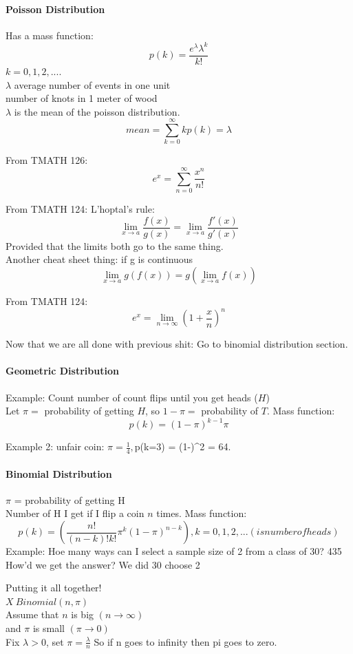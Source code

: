 \documentclass{article}
\newcommand{\p}[1]{\paragraph{#1}} %
\begin{document}
		\p{Poisson Distribution}
		Has a mass function:
		\[
			p(k) = \frac{e^\lambda \lambda^k}{k!}
		\]
		$k = 0, 1, 2,....$ \\
		$\lambda$ average number of events in one unit \\
		\hspace{17pt} number of knots in 1 meter of wood\\
		$\lambda$ is the mean of the poisson distribution.
		\[
			mean = \sum_{k=0}^{\infty} kp(k) = \lambda
		\]
		
		From TMATH 126:
		\[
			e^x = \sum_{n=0}^{\infty} \frac{x^n}{n!}
		\]
		
		From TMATH 124: L'hoptal's rule:
		\[
			\lim_{x\to a} \frac{f(x)}{g(x)} = \lim_{x\to a} \frac{f\prime(x)}{g\prime(x)}
		\]
		Provided that the limits both go to the same thing. \\
		
		Another cheat sheet thing: if g is continuous
		\[
			\lim_{x\to a} g(f(x)) = g(\lim_{x\to a} f(x))
		\]
		
		From TMATH 124:
		\[
			e^x = \lim_{n\to\infty} (1 + \frac{x}{n})^n
		\]
		
		Now that we are all done with previous shit: Go to binomial distribution section.
		
		\p{Geometric Distribution}
		Example: Count number of count flips until you get heads ($H$) \\
		Let $\pi =$ probability of getting $H$, so $1-\pi =$ probability of $T$. Mass function:
		\[
			p(k) = (1-\pi)^{k-1}\pi
		\]
		
		Example 2: unfair coin: $\pi = \frac{1}{4}, $p(k=3) = (1-)^2 = 
		{64}. 
		
		\p{Binomial Distribution}
		$\pi$ = probability of getting H \\
		Number of H I get if I flip a coin $n$ times. Mass function:
		\[
			p(k) = \left( \frac{n!}{(n-k)! k!} \pi^k (1-\pi)^{n-k} \right), k = 0,1,2,... (is number of heads)
		\]
		Example: Hoe many ways can I select a sample size of 2 from a class of 30? 435 How'd we get the answer? We did 30 choose 2
		
		Putting it all together! \\
		$X ~ Binomial(n, \pi)$ \\
		Assume that $n$ is big $(n \to \infty)$\\
		and $\pi$ is small $(\pi \to 0)$ \\
		Fix $\lambda > 0$, set $\pi = \frac{\lambda}{n}$ So if n goes to infinity then pi 
		goes to zero. \\
		
\end{document}
